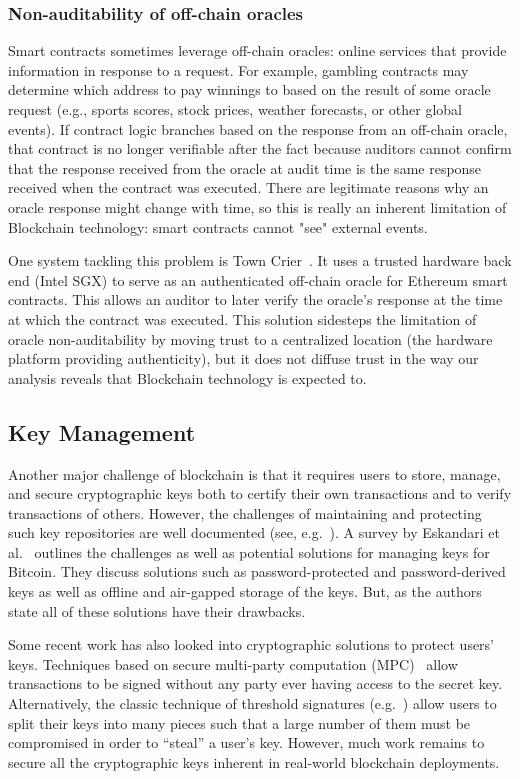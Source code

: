\subsubsection{Non-auditability of off-chain oracles}
Smart contracts sometimes leverage off-chain oracles: online services that provide information in response to a request. For example, gambling contracts may determine which address to pay winnings to based on the result of some oracle request (e.g., sports scores, stock prices, weather forecasts, or other global events). If contract logic branches based on the response from an off-chain oracle, that contract is no longer verifiable after the fact because auditors cannot confirm that the response received from the oracle at audit time is the same response received when the contract was executed. There are legitimate reasons why an oracle response might change with time, so this is really an inherent limitation of Blockchain technology: smart contracts cannot "see" external events.

One system tackling this problem is Town Crier~\cite{Zhang16}. It uses a trusted hardware back end (Intel SGX) to serve as an authenticated off-chain oracle for Ethereum smart contracts. This allows an auditor to later verify the oracle's response at the time at which the contract was executed. This solution sidesteps the limitation of oracle non-auditability by moving trust to a centralized location (the hardware platform providing authenticity), but it does not diffuse trust in the way our analysis reveals that Blockchain technology is expected to.

\subsection{Key Management}
Another major challenge of blockchain is that it requires users to store, manage, and secure cryptographic keys both to certify their own transactions and to verify transactions of others.  However, the challenges of maintaining and protecting such key repositories are well documented (see, e.g.~\cite{uss:WhiTyg99}).  A survey by Eskandari et al.~\cite{arxiv:ECBS18} outlines the challenges as well as potential solutions for managing keys for Bitcoin.  They discuss solutions such as password-protected and password-derived keys as well as offline and air-gapped storage of the keys.  But, as the authors state all of these solutions have their drawbacks.

Some recent work has also looked into cryptographic solutions to protect users' keys.  Techniques based on secure multi-party computation (MPC)~\cite{CCS:LinNof18,C:Lindell17} allow transactions to be signed without any party ever having access to the secret key.  Alternatively, the classic technique of threshold signatures (e.g.~\cite{PKC:Boldyreva03,EC:GJKR96,EC:Shoup00a}) allow users to split their keys into many pieces such that a large number of them must be compromised in order to ``steal'' a user's key.  However, much work remains to secure all the cryptographic keys inherent in real-world blockchain deployments.


